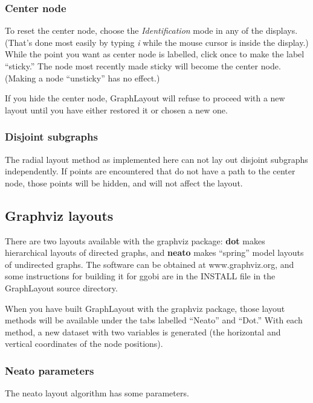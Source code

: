 \documentclass[11pt]{article}
\begin{document}
\subsubsection{Center node}

To reset the center node, choose the {\em Identification} mode in
any of the displays.  (That's done most easily by typing {\em i} while
the mouse cursor is inside the display.)  While the point you want
as center node is labelled, click once to make the label ``sticky.''
The node most recently made sticky will become the center node.
(Making a node ``unsticky'' has no effect.)

If you hide the center node, GraphLayout will refuse to proceed with
a new layout until you have either restored it or chosen a new one.

\subsubsection{Disjoint subgraphs}

The radial layout method as implemented here can not lay out
disjoint subgraphs independently.  If points are encountered that
do not have a path to the center node, those points will be hidden,
and will not affect the layout.

\subsection {Graphviz layouts}

There are two layouts available with the graphviz \cite{GansnerNorth00}
package:  {\bf dot} makes hierarchical layouts of directed graphs,
and {\bf neato} makes ``spring'' model layouts of undirected graphs.
The software can be obtained at www.graphviz.org, and some instructions
for building it for ggobi are in the INSTALL file in the GraphLayout
source directory.

When you have built GraphLayout with the graphviz package, those
layout methods will be available under the tabs labelled ``Neato'' and
``Dot.''  With each method, a new dataset with two variables is generated
(the horizontal and vertical coordinates of the node positions).

\subsubsection{Neato parameters}

The neato layout algorithm has some parameters.
\end{document}
